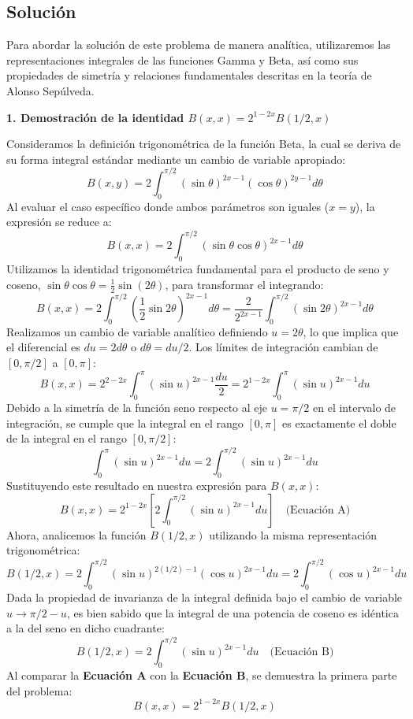 \documentclass[a4paper]{article}
\begin{document}
\subsection{Solución}

Para abordar la solución de este problema de manera analítica, utilizaremos las representaciones integrales de las funciones Gamma y Beta, así como sus propiedades de simetría y relaciones fundamentales descritas en la teoría de Alonso Sepúlveda.

\textbf{1. Demostración de la identidad $B(x, x) = 2^{1-2x}B(1/2, x)$}

Consideramos la definición trigonométrica de la función Beta, la cual se deriva de su forma integral estándar mediante un cambio de variable apropiado:
$$ B(x, y) = 2 \int_{0}^{\pi/2} (\sin \theta)^{2x-1} (\cos \theta)^{2y-1} d\theta $$
Al evaluar el caso específico donde ambos parámetros son iguales ($x = y$), la expresión se reduce a:
$$ B(x, x) = 2 \int_{0}^{\pi/2} (\sin \theta \cos \theta)^{2x-1} d\theta $$
Utilizamos la identidad trigonométrica fundamental para el producto de seno y coseno, $\sin \theta \cos \theta = \frac{1}{2} \sin(2\theta)$, para transformar el integrando:
$$ B(x, x) = 2 \int_{0}^{\pi/2} \left( \frac{1}{2} \sin 2\theta \right)^{2x-1} d\theta = \frac{2}{2^{2x-1}} \int_{0}^{\pi/2} (\sin 2\theta)^{2x-1} d\theta $$
Realizamos un cambio de variable analítico definiendo $u = 2\theta$, lo que implica que el diferencial es $du = 2d\theta$ o $d\theta = du/2$. Los límites de integración cambian de $[0, \pi/2]$ a $[0, \pi]$:
$$ B(x, x) = 2^{2-2x} \int_{0}^{\pi} (\sin u)^{2x-1} \frac{du}{2} = 2^{1-2x} \int_{0}^{\pi} (\sin u)^{2x-1} du $$
Debido a la simetría de la función seno respecto al eje $u = \pi/2$ en el intervalo de integración, se cumple que la integral en el rango $[0, \pi]$ es exactamente el doble de la integral en el rango $[0, \pi/2]$:
$$ \int_{0}^{\pi} (\sin u)^{2x-1} du = 2 \int_{0}^{\pi/2} (\sin u)^{2x-1} du $$
Sustituyendo este resultado en nuestra expresión para $B(x, x)$:
$$ B(x, x) = 2^{1-2x} \left[ 2 \int_{0}^{\pi/2} (\sin u)^{2x-1} du \right] \quad \text{(Ecuación A)} $$
Ahora, analicemos la función $B(1/2, x)$ utilizando la misma representación trigonométrica:
$$ B(1/2, x) = 2 \int_{0}^{\pi/2} (\sin u)^{2(1/2)-1} (\cos u)^{2x-1} du = 2 \int_{0}^{\pi/2} (\cos u)^{2x-1} du $$
Dada la propiedad de invarianza de la integral definida bajo el cambio de variable $u \to \pi/2 - u$, es bien sabido que la integral de una potencia de coseno es idéntica a la del seno en dicho cuadrante:
$$ B(1/2, x) = 2 \int_{0}^{\pi/2} (\sin u)^{2x-1} du \quad \text{(Ecuación B)} $$
Al comparar la \textbf{Ecuación A} con la \textbf{Ecuación B}, se demuestra la primera parte del problema:
$$ B(x, x) = 2^{1-2x} B(1/2, x) $$
\end{document}
